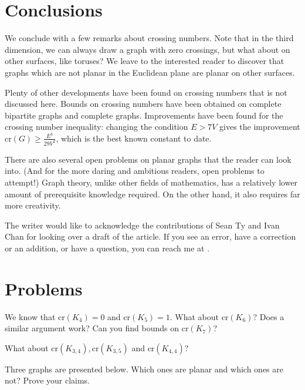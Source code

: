 \documentclass[11pt,paper=letter]{scrartcl}
\newcommand{\crs}[1]{\mathrm{cr}(#1)}
\begin{document}
\section{Conclusions}

We conclude with a few remarks about crossing numbers. Note that in the third dimension, we can always draw a graph with zero crossings, but what about on other surfaces, like toruses? We leave to the interested reader to discover that graphs which are not planar in the Euclidean plane are planar on other surfaces.

Plenty of other developments have been found on crossing numbers that is not discussed here. Bounds on crossing numbers have been obtained on complete bipartite graphs and complete graphs. Improvements have been found for the crossing number inequality: changing the condition $E > 7V$ gives the improvement $\crs{G} \geq \frac{E^3}{29V^2}$, which is the best known constant to date.

There are also several open problems on planar graphs that the reader can look into. (And for the more daring and ambitious readers, open problems to attempt!) Graph theory, unlike other fields of mathematics, has a relatively lower amount of prerequisite knowledge required. On the other hand, it also requires far more creativity.

The writer would like to acknowledge the contributions of Sean Ty and Ivan Chan for looking over a draft of the article. If you see an error, have a correction or an addition, or have a question, you can reach me at .

\section{Problems}

\begin{problem}
We know that $\crs{K_4} = 0$ and $\crs{K_5} = 1$. What about $\crs{K_6}$? Does a similar argument work? Can you find bounds on $\crs{K_7}$?
\end{problem}

\begin{problem}
What about $\crs{K_{3,4}}, \crs{K_{3,5}}$ and $\crs{K_{4,4}}$?
\end{problem}

\begin{problem}
Three graphs are presented below. Which ones are planar and which ones are not? Prove your claims.
\end{problem}
\end{document}
